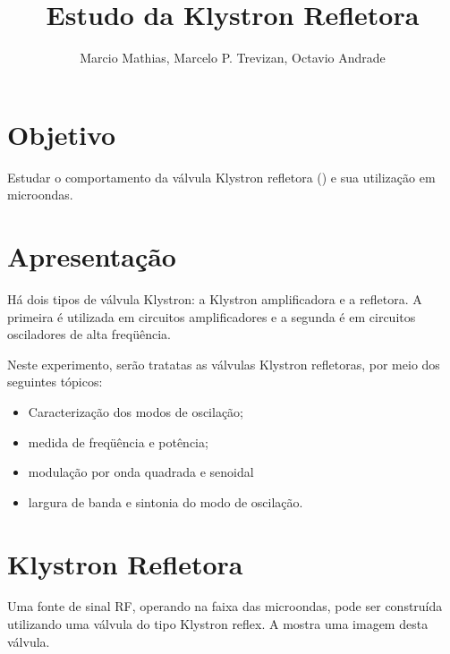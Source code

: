 \documentclass[a4paper,12pt]{article}
\title{Estudo da Klystron Refletora}
\author{Marcio Mathias, Marcelo P. Trevizan, Octavio Andrade}
\begin{document}
	\maketitle


    \section{Objetivo}
    
    Estudar o comportamento da válvula Klystron refletora () e sua utilização em microondas.


    \section{Apresentação}

    Há dois tipos de válvula Klystron: a Klystron amplificadora e a refletora. A primeira é utilizada em circuitos amplificadores e a segunda é em circuitos osciladores de alta freqüência.


    Neste experimento, serão tratatas as válvulas Klystron refletoras, por meio dos seguintes tópicos:

    \begin{itemize}
        \item Caracterização dos modos de oscilação;
        \item medida de freqüência e potência;
        \item modulação por onda quadrada e senoidal
        \item largura de banda e sintonia do modo de oscilação.
    \end{itemize}


    \section{Klystron Refletora}

    Uma fonte de sinal RF, operando na faixa das microondas, pode ser construída utilizando uma válvula do tipo Klystron reflex. A  mostra uma imagem desta válvula.
\end{document}
